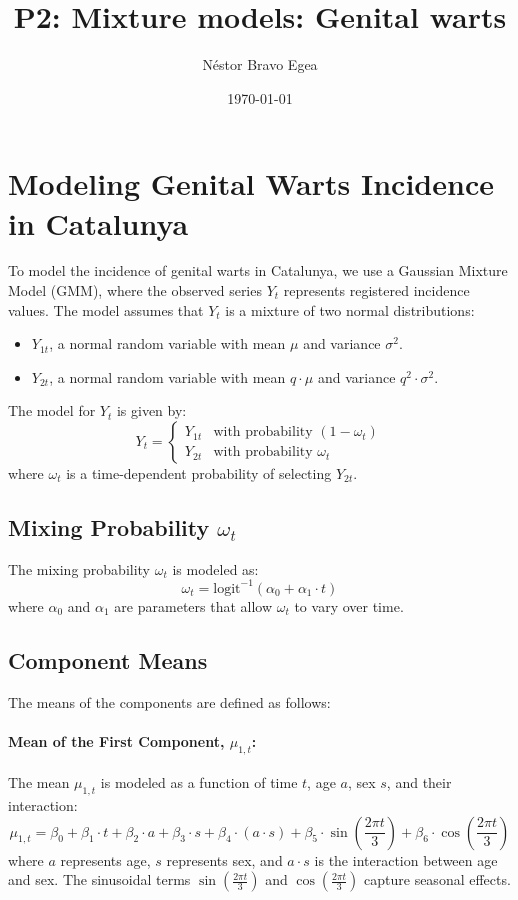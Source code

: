 \documentclass[a4paper,12pt]{article}
\title{P2: Mixture models: Genital warts}
\author{Néstor Bravo Egea}
\date{\today}
\begin{document}
\maketitle

\section{Modeling Genital Warts Incidence in Catalunya}

To model the incidence of genital warts in Catalunya, we use a Gaussian Mixture Model (GMM), where the observed series \( Y_t \) represents registered incidence values. The model assumes that \( Y_t \) is a mixture of two normal distributions:

\begin{itemize}
    \item \( Y_{1t} \), a normal random variable with mean \( \mu \) and variance \( \sigma^2 \).
    \item \( Y_{2t} \), a normal random variable with mean \( q \cdot \mu \) and variance \( q^2 \cdot \sigma^2 \).
\end{itemize}

The model for \( Y_t \) is given by:
\[
Y_t = \begin{cases} 
      Y_{1t} & \text{with probability } (1 - \omega_t) \\
      Y_{2t} & \text{with probability } \omega_t 
   \end{cases}
\]
where \( \omega_t \) is a time-dependent probability of selecting \( Y_{2t} \).

\subsection{Mixing Probability \( \omega_t \)}
The mixing probability \( \omega_t \) is modeled as:
\[
\omega_t = \text{logit}^{-1}(\alpha_0 + \alpha_1 \cdot t)
\]
where \( \alpha_0 \) and \( \alpha_1 \) are parameters that allow \( \omega_t \) to vary over time.

\subsection{Component Means}
The means of the components are defined as follows:

\paragraph{Mean of the First Component, \( \mu_{1,t} \):}
The mean \( \mu_{1,t} \) is modeled as a function of time \( t \), age \( a \), sex \( s \), and their interaction:
\[
\mu_{1,t} = \beta_0 + \beta_1 \cdot t + \beta_2 \cdot a + \beta_3 \cdot s + \beta_4 \cdot (a \cdot s) + \beta_5 \cdot \sin\left(\frac{2 \pi t}{3}\right) + \beta_6 \cdot \cos\left(\frac{2 \pi t}{3}\right)
\]
where \( a \) represents age, \( s \) represents sex, and \( a \cdot s \) is the interaction between age and sex. The sinusoidal terms \( \sin\left(\frac{2 \pi t}{3}\right) \) and \( \cos\left(\frac{2 \pi t}{3}\right) \) capture seasonal effects.
\end{document}
